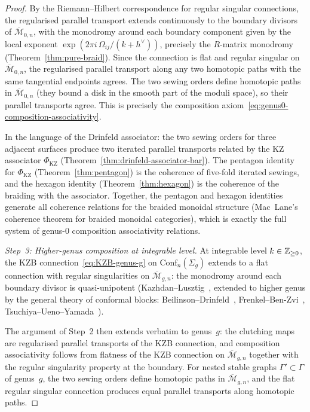 \begin{proof}
By the Riemann--Hilbert correspondence for regular singular
connections, the regularised parallel transport extends
continuously to the boundary divisors of
$\overline{\mathcal{M}}_{0,n}$, with the monodromy around
each boundary component given by the local exponent
$\exp(2\pi i\, \Omega_{ij}/(k+h^\vee))$, precisely the
$R$-matrix monodromy
\textup{(}Theorem~\textup{\ref{thm:pure-braid}}\textup{)}.
Since the connection is flat and regular singular on
$\overline{\mathcal{M}}_{0,n}$, the regularised parallel
transport along any two homotopic paths with the same
tangential endpoints agrees. The two sewing orders define
homotopic paths in $\overline{\mathcal{M}}_{0,n}$
\textup{(}they bound a disk in the smooth part of the
moduli space\textup{)}, so their parallel transports agree.
This is precisely the composition
axiom~\eqref{eq:genus0-composition-associativity}.

In the language of the Drinfeld associator: the two sewing
orders for three adjacent surfaces produce two iterated
parallel transports related by the KZ associator
$\Phi_{\mathrm{KZ}}$
\textup{(}Theorem~\textup{\ref{thm:drinfeld-associator-bar}}\textup{)}.
The pentagon identity for $\Phi_{\mathrm{KZ}}$
\textup{(}Theorem~\textup{\ref{thm:pentagon}}\textup{)}
is the coherence of five-fold iterated sewings, and
the hexagon identity
\textup{(}Theorem~\textup{\ref{thm:hexagon}}\textup{)}
is the coherence of the braiding with the associator. Together,
the pentagon and hexagon identities generate all coherence
relations for the braided monoidal structure
\textup{(}Mac~Lane's coherence theorem for braided monoidal
categories\textup{)}, which is exactly the full system of
genus-$0$ composition associativity relations.

\medskip\noindent
\emph{Step~3: Higher-genus composition at integrable level.}
At integrable level $k \in \mathbb{Z}_{\ge 0}$, the KZB
connection~\eqref{eq:KZB-genus-g} on
$\mathrm{Conf}_n(\Sigma_g)$ extends to a flat connection with
regular singularities on $\overline{\mathcal{M}}_{g,n}$: the
monodromy around each boundary divisor is quasi-unipotent
\textup{(}Kazhdan--Lusztig~\cite{KL93}, extended to higher genus
by the general theory of conformal blocks:
Beilinson--Drinfeld~\cite{BD04}, Frenkel--Ben-Zvi~\cite{FBZ04},
Tsuchiya--Ueno--Yamada~\cite{TUY89}\textup{)}.

The argument of Step~2 then extends verbatim to genus~$g$:
the clutching maps are regularised parallel transports of the
KZB connection, and composition associativity follows from
flatness of the KZB connection on
$\overline{\mathcal{M}}_{g,n}$ together with the regular
singularity property at the boundary. For nested stable graphs
$\Gamma' \subset \Gamma$ of genus~$g$, the two sewing orders
define homotopic paths in $\overline{\mathcal{M}}_{g,n}$,
and the flat regular singular connection produces equal
parallel transports along homotopic paths.


\end{proof}

